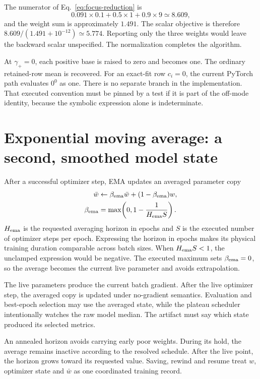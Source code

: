 \documentclass[10pt,aps,prd,twocolumn,nofootinbib]{revtex4-2}
\begin{document}
The numerator of Eq.~\eqref{eq:focus-reduction} is
\begin{equation*}
 0.091\times0.1+0.5\times1+0.9\times9\simeq8.609,
\end{equation*}
and the weight sum is approximately $1.491$.  The scalar objective is therefore
$8.609/(1.491+10^{-12})\simeq5.774$.  Reporting only the three weights would
leave the backward scalar unspecified.  The normalization completes the algorithm.

At $\gamma_+=0$, each positive base is raised to zero and becomes one.  The
ordinary retained-row mean is recovered.  For an exact-fit row $c_i=0$, the
current PyTorch path evaluates $0^0$ as one.  There is no separate branch in
the implementation.  That executed convention must be pinned by a test if it
is part of the off-mode identity, because the symbolic expression alone is
indeterminate.

\section{Exponential moving average: a second, smoothed model state}
\label{sec:ema}

After a successful optimizer step, EMA updates an averaged parameter copy
\begin{equation}
\begin{aligned}
 \bar w&\leftarrow\beta_{\rm ema}\bar w
 +(1-\beta_{\rm ema})w,\\
 \beta_{\rm ema}&=\max\!\left(0,1-\frac{1}{H_{\rm ema}S}\right).
\end{aligned}
 \label{eq:ema}
\end{equation}
\(H_{\rm ema}\) is the requested averaging horizon in epochs and \(S\) is the
executed number of optimizer steps per epoch.  Expressing the horizon in epochs makes its
physical training duration comparable across batch sizes.
When $H_{\rm ema}S<1$, the unclamped expression would be negative.  The executed
maximum sets $\beta_{\rm ema}=0$, so the average becomes the current live
parameter and avoids extrapolation.

The live parameters produce the current batch gradient.  After the live
optimizer step, the averaged copy is updated under no-gradient semantics.
Evaluation and best-epoch selection may use the averaged state,
while the plateau scheduler intentionally watches the raw model median.  The
artifact must say which state produced its selected metrics.

An annealed horizon avoids carrying early poor weights.  During its hold, the
average remains inactive according to the resolved schedule.  After the live
point, the horizon grows toward its requested value.  Saving, rewind and
resume treat \(w\), optimizer state and \(\bar w\) as one coordinated
training record.
\end{document}
